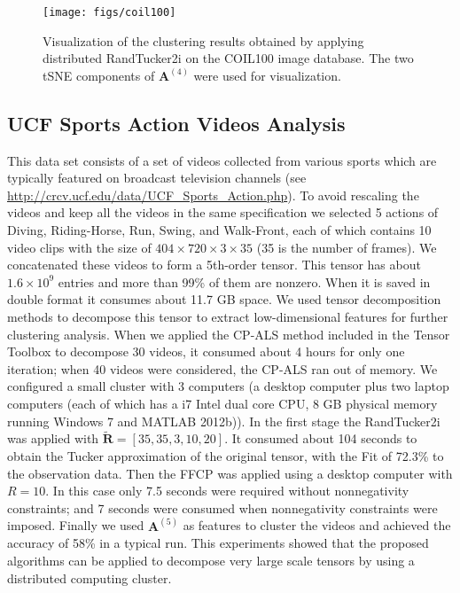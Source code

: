 \documentclass[10pt,twocolumn,twoside]{IEEEtran}
\newcommand{\mat}[1]{\ensuremath{\mathbf{#1}}}
\newcommand{\matn}[2][n]{\ensuremath{\mathbf{#2}^{(#1)}}}
\begin{document}
 \begin{figure}[!t]
\centerline{
    \texttt{[image: figs/coil100]}
}
\caption{Visualization of the clustering results obtained by applying distributed RandTucker2i on the COIL100 image database. The two tSNE components of \matn[4]{A} were used for visualization.}
\label{fig:COIL100clusters}
\end{figure}

\subsection{UCF Sports Action Videos Analysis}
This data set consists of a set of videos collected from various sports which are typically featured on broadcast television channels \cite{UCFSports} (see \url{http://crcv.ucf.edu/data/UCF_Sports_Action.php}). To avoid rescaling the videos and keep all the videos in the same specification we selected 5 actions of Diving, Riding-Horse, Run, Swing, and Walk-Front, each of which contains 10 video clips with the size of $404\times720\times3\times35$ (35 is the number of frames). We concatenated these videos to form a 5th-order tensor. This tensor has about $1.6\times 10^9$ entries and more than 99\% of them are nonzero. When it is saved in double format it consumes about 11.7 GB space. We used tensor decomposition methods to decompose this tensor to extract low-dimensional features for further clustering analysis. When we applied the CP-ALS method included in the Tensor Toolbox to decompose 30 videos, it consumed about 4 hours for only one iteration; when 40 videos were considered, the CP-ALS ran out of memory. We configured a small cluster with 3 computers (a desktop computer plus two laptop computers (each of which has a i7 Intel dual core CPU, 8 GB physical memory running Windows 7 and MATLAB 2012b)). In the first stage the RandTucker2i was applied with $\mat{\tilde{R}}=[35,35,3,10,20]$. It consumed about 104 seconds to obtain the Tucker approximation of the original tensor, with the Fit of 72.3\% to the observation data. Then the FFCP was applied using a desktop computer with $R=10$. In this case only 7.5 seconds were required without nonnegativity constraints; and 7 seconds were consumed when nonnegativity constraints were imposed. Finally we used \matn[5]{A} as features to cluster the videos and achieved the accuracy of 58\% in a typical run. This experiments showed that the proposed algorithms can be applied to decompose very large scale tensors by using a distributed computing cluster.
\end{document}
